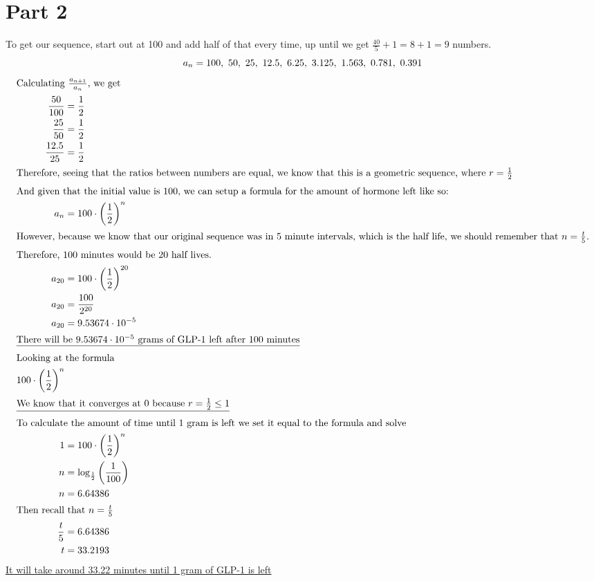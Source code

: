 \documentclass[12pt]{article}
\begin{document}
\section{Part 2}
To get our sequence, start out at 100 and add half of that every time, up until we get $\frac{40}{5}+1=8+1=9$ numbers.
\begin{equation}
  a_{n}                             =100,\ 50,\ 25,\ 12.5,\ 6.25,\ 3.125,\ 1.563,\ 0.781,\ 0.391 \\
\end{equation}
\begin{align}
  \intertext{Calculating $\frac{a_{n+1}}{a_n}$, we get }
  \frac{50}{100}  & =\frac{1}{2}                                  \\
  \frac{25}{50}   & =\frac{1}{2}                                  \\
  \frac{12.5}{25} & =\frac{1}{2}                                  \\
  \intertext{Therefore, seeing that the ratios between numbers are equal, we know that this is a geometric sequence, where $r=\frac{1}{2}$}
  \intertext{And given that the initial value is 100, we can setup a formula for the amount of hormone left like so:}
  a_{n}           & =100\cdot\left(\frac{1}{2}\right)^{n}         \\
  \intertext{However, because we know that our original sequence was in 5 minute intervals, which is the half life, we should remember that $n=\frac{t}{5}$.}
  \intertext{Therefore, 100 minutes would be 20 half lives.}
  a_{20}          & =100\cdot\left(\frac{1}{2}\right)^{20}        \\
  a_{20}          & =\frac{100}{2^{20}}                           \\
  a_{20}          & =9.53674\cdot10^{-5}                          \\
  \intertext{\underline{There will be $9.53674\cdot10^{-5}$ grams of GLP-1 left after 100 minutes}}
  \intertext{Looking at the formula}
  100\cdot\left(\frac{1}{2}\right)^{n}                            \\
  \intertext{\underline{We know that it converges at 0 because $r=\frac{1}{2}\leq 1$}}
  \intertext{To calculate the amount of time until 1 gram is left we set it equal to the formula and solve}
  1               & =100\cdot\left(\frac{1}{2}\right)^{n}         \\
  n               & =\log_{\frac{1}{2}}\left(\frac{1}{100}\right) \\
  n               & =6.64386                                      \\
  \intertext{Then recall that $n=\frac{t}{5}$}
  \frac{t}{5}     & =6.64386                                      \\
  t               & =33.2193
\end{align}
\underline{It will take around 33.22 minutes until 1 gram of GLP-1 is left}
\end{document}
